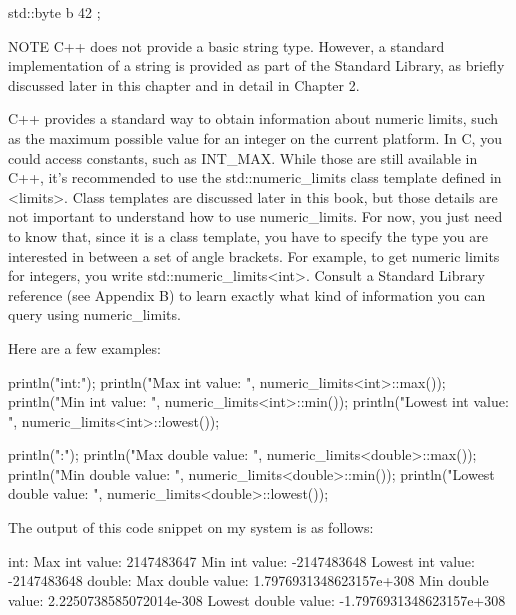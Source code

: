 \begin{cpp}
std::byte b { 42 };
\end{cpp}

\begin{myNotic}{NOTE}
C++ does not provide a basic string type. However, a standard implementation of a string is provided as part of the Standard Library, as briefly discussed later in this chapter and in detail in Chapter 2.
\end{myNotic}


C++ provides a standard way to obtain information about numeric limits, such as the maximum possible value for an integer on the current platform. In C, you could access constants, such as INT\_MAX. While those are still available in C++, it’s recommended to use the std::numeric\_limits class template defined in <limits>. Class templates are discussed later in this book, but those details are not important to understand how to use numeric\_limits. For now, you just need to know that, since it is a class template, you have to specify the type you are interested in between a set of angle brackets. For example, to get numeric limits for integers, you write std::numeric\_limits<int>. Consult a Standard Library reference (see Appendix B) to learn exactly what kind of information you can query using numeric\_limits.

Here are a few examples:

\begin{cpp}
println("int:");
println("Max int value: {}", numeric_limits<int>::max());
println("Min int value: {}", numeric_limits<int>::min());
println("Lowest int value: {}", numeric_limits<int>::lowest());

println("\ndouble:");
println("Max double value: {}", numeric_limits<double>::max());
println("Min double value: {}", numeric_limits<double>::min());
println("Lowest double value: {}", numeric_limits<double>::lowest());
\end{cpp}

The output of this code snippet on my system is as follows:

\begin{shell}
int:
Max int value: 2147483647
Min int value: -2147483648
Lowest int value: -2147483648
double:
Max double value: 1.7976931348623157e+308
Min double value: 2.2250738585072014e-308
Lowest double value: -1.7976931348623157e+308
\end{shell}


